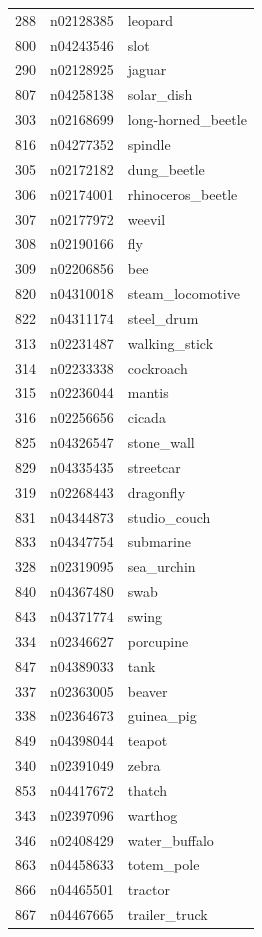 \begin{table}
\begin{tabular}{cll}
288 & n02128385 & leopard \\
800 & n04243546 & slot \\
290 & n02128925 & jaguar \\
807 & n04258138 & solar_dish \\
303 & n02168699 & long-horned_beetle \\
816 & n04277352 & spindle \\
305 & n02172182 & dung_beetle \\
306 & n02174001 & rhinoceros_beetle \\
307 & n02177972 & weevil \\
308 & n02190166 & fly \\
309 & n02206856 & bee \\
820 & n04310018 & steam_locomotive \\
822 & n04311174 & steel_drum \\
313 & n02231487 & walking_stick \\
314 & n02233338 & cockroach \\
315 & n02236044 & mantis \\
316 & n02256656 & cicada \\
825 & n04326547 & stone_wall \\
829 & n04335435 & streetcar \\
319 & n02268443 & dragonfly \\
831 & n04344873 & studio_couch \\
833 & n04347754 & submarine \\
328 & n02319095 & sea_urchin \\
840 & n04367480 & swab \\
843 & n04371774 & swing \\
334 & n02346627 & porcupine \\
847 & n04389033 & tank \\
337 & n02363005 & beaver \\
338 & n02364673 & guinea_pig \\
849 & n04398044 & teapot \\
340 & n02391049 & zebra \\
853 & n04417672 & thatch \\
343 & n02397096 & warthog \\
346 & n02408429 & water_buffalo \\
863 & n04458633 & totem_pole \\
866 & n04465501 & tractor \\
867 & n04467665 & trailer_truck \\

\end{tabular}
\end{table}
